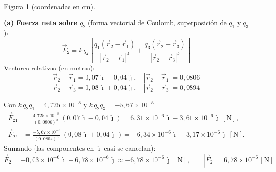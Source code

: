 \documentclass[12pt,letterpaper]{article}
\begin{document}
\noindent
\begin{minipage}[t]{0.38\textwidth}
\centering
\vspace{0pt}
\\[2pt]
{\scriptsize Figura 1 (coordenadas en cm).}
\end{minipage}%
\hfill
\begin{minipage}[t]{0.58\textwidth}
\vspace{0pt}
\textbf{(a) Fuerza neta sobre $q_2$} (forma vectorial de Coulomb, superposici\'on de $q_1$ y $q_3$):
\[
    \vec F_2 = k\,q_2\!\left[\frac{q_1(\vec r_2-\vec r_1)}{|\vec r_2-\vec r_1|^3}
                          + \frac{q_3(\vec r_2-\vec r_3)}{|\vec r_2-\vec r_3|^3}\right]
\]
Vectores relativos (en metros):
\[
    \vec r_2-\vec r_1 = 0{,}07\,\hat\imath - 0{,}04\,\hat\jmath,\quad |\vec r_2-\vec r_1| = 0{,}0806
\]
\[
    \vec r_2-\vec r_3 = 0{,}08\,\hat\imath + 0{,}04\,\hat\jmath,\quad |\vec r_2-\vec r_3| = 0{,}0894
\]
\end{minipage}

\smallskip
\noindent Con $k\,q_2q_1 = 4{,}725\times10^{-8}$ y $k\,q_2q_3 = -5{,}67\times10^{-8}$:
\begin{align*}
    \vec F_{21} &= \frac{4{,}725\times10^{-8}}{(0{,}0806)^3}\,(0{,}07\,\hat\imath - 0{,}04\,\hat\jmath)
        = 6{,}31\times10^{-6}\,\hat\imath - 3{,}61\times10^{-6}\,\hat\jmath\ [\text{N}],\\[2pt]
    \vec F_{23} &= \frac{-5{,}67\times10^{-8}}{(0{,}0894)^3}\,(0{,}08\,\hat\imath + 0{,}04\,\hat\jmath)
        = -6{,}34\times10^{-6}\,\hat\imath - 3{,}17\times10^{-6}\,\hat\jmath\ [\text{N}].
\end{align*}
Sumando (las componentes en $\hat\imath$ casi se cancelan):
\[
    \boxed{\vec F_2 = -0{,}03\times10^{-6}\,\hat\imath - 6{,}78\times10^{-6}\,\hat\jmath
    \approx -6{,}78\times10^{-6}\,\hat\jmath\ [\text{N}],\qquad |\vec F_2| = 6{,}78\times10^{-6}\ [\text{N}]}
\]
\end{document}
